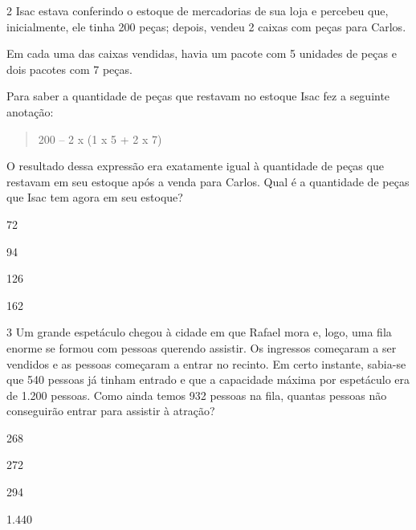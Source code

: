 \num{2} Isac estava conferindo o estoque de mercadorias de sua loja e
percebeu que, inicialmente, ele tinha 200 peças; depois, vendeu 2 caixas com peças para Carlos.

Em cada uma das caixas vendidas, havia um pacote com 5 unidades de peças e dois
pacotes com 7 peças.

Para saber a quantidade de peças que restavam no estoque Isac fez a
seguinte anotação:

\begin{quote}
200 -- 2 x (1 x 5 + 2 x 7)
\end{quote}

O resultado dessa expressão era exatamente igual à quantidade de peças
que restavam em seu estoque após a venda para Carlos. Qual é a
quantidade de peças que Isac tem agora em seu estoque?

\begin{escolha}
\item
  72
\item
  94
\item
  126
\item
  162
\end{escolha}


\num{3} Um grande espetáculo chegou à cidade em que Rafael mora e, logo, uma fila
enorme se formou com pessoas querendo assistir. Os
ingressos começaram a ser vendidos e as pessoas começaram a entrar no
recinto. Em certo instante, sabia-se que 540 pessoas já tinham
entrado e que a capacidade máxima por espetáculo era de 1.200 pessoas. Como ainda temos 932 pessoas na fila, quantas pessoas não
conseguirão entrar para assistir à atração?

\begin{escolha}
\item
  268
\item
  272
\item
  294
\item
  1.440
\end{escolha}




